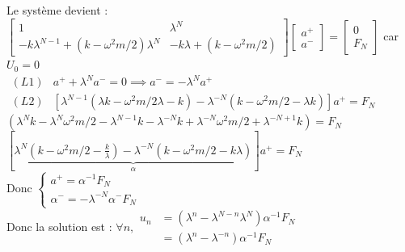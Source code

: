 \documentclass[12pt,a4paper]{article}
\begin{document}
\begin{sol}
\begin{minipage}{18cm}
			Le système devient : $\begin{bmatrix}
				1 & \lambda^N \\
				-k\lambda^{N-1}+(k-\omega^2m/2)\lambda^N & -k\lambda+(k-\omega^2m/2)
			\end{bmatrix}\begin{bmatrix}
				a^+ \\ a^-
			\end{bmatrix} = \begin{bmatrix}
				0 \\ F_N
			\end{bmatrix}$ car $U_0 = 0$\\
			
			$\begin{aligned}
				(L1) & a^+ + \lambda^Na^- = 0 \implies a^- = -\lambda^N a^+ \\
				(L2) & \left[\lambda^{N-1}(\lambda k - \omega^2m/2 \lambda - k) - \lambda^{-N}(k-\omega^2m/2-\lambda k)\right]a^+ = F_N
			\end{aligned}$\\
			
			$\left(\lambda^N k - \lambda^N\omega^2m/2 - \lambda^{N-1}k-\lambda^{-N}k + \lambda^{-N}\omega^2m/2+\lambda^{-N+1}k\right) = F_N$\\
			$\left[\underbrace{\lambda^N\left(k-\omega^2m/2 - \frac k\lambda\right) - \lambda^{-N}\left(k-\omega^2m/2-k\lambda\right)}_{\alpha}\right]a^+ = F_N$\\
			Donc $\begin{cases}
				a^+ = \alpha^{-1}F_N \\
				\alpha^- = -\lambda^{-N}\alpha^-F_N
			\end{cases}$\\
			Donc la solution est : $\forall n, \begin{aligned}
				u_n &= \left(\lambda^n - \lambda^{N-n}\lambda^N\right)\alpha^{-1}F_N\\
				&=\left(\lambda^n-\lambda^{-n}\right)\alpha^{-1}F_N
			\end{aligned}$
		\end{minipage}
	\end{sol}
	
\end{document}
